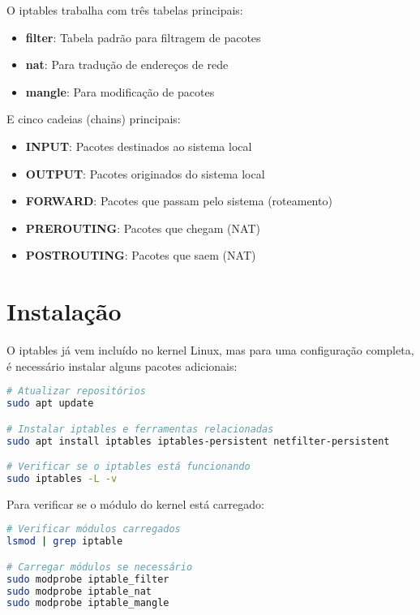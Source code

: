 \documentclass[12pt,fleqn]{article}
\begin{document}
O iptables trabalha com três tabelas principais:
\begin{itemize}
    \item \textbf{filter}: Tabela padrão para filtragem de pacotes
    \item \textbf{nat}: Para tradução de endereços de rede
    \item \textbf{mangle}: Para modificação de pacotes
\end{itemize}

E cinco cadeias (chains) principais:
\begin{itemize}
    \item \textbf{INPUT}: Pacotes destinados ao sistema local
    \item \textbf{OUTPUT}: Pacotes originados do sistema local
    \item \textbf{FORWARD}: Pacotes que passam pelo sistema (roteamento)
    \item \textbf{PREROUTING}: Pacotes que chegam (NAT)
    \item \textbf{POSTROUTING}: Pacotes que saem (NAT)
\end{itemize}

\section{Instalação}

O iptables já vem incluído no kernel Linux, mas para uma configuração completa, é necessário instalar alguns pacotes adicionais:

\begin{lstlisting}[language=bash, caption=Instalação do iptables]
# Atualizar repositórios
sudo apt update

# Instalar iptables e ferramentas relacionadas
sudo apt install iptables iptables-persistent netfilter-persistent

# Verificar se o iptables está funcionando
sudo iptables -L -v
\end{lstlisting}

Para verificar se o módulo do kernel está carregado:

\begin{lstlisting}[language=bash, caption=Verificação de módulos]
# Verificar módulos carregados
lsmod | grep iptable

# Carregar módulos se necessário
sudo modprobe iptable_filter
sudo modprobe iptable_nat
sudo modprobe iptable_mangle
\end{lstlisting}
\end{document}
